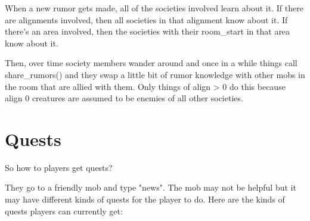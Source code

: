 When a new rumor gets made, all of the societies involved learn
about it. If there are alignments involved, then all societies in
that alignment know about it. If there's an area involved, then
the societies with their room\_start in that area know about it.

Then, over time society members wander around and once in a while
things call share\_rumors() and they swap a little bit of
rumor knowledge with other mobs in the room that are allied
with them. Only things of align > 0 do this because align 0
creatures are assumed to be enemies of all other societies.

\section{Quests}

So how to players get quests?

They go to a friendly mob and type "news". The mob may not be helpful
but it may have different kinds of quests for the player to do. 
Here are the kinds of quests players can currently get:

